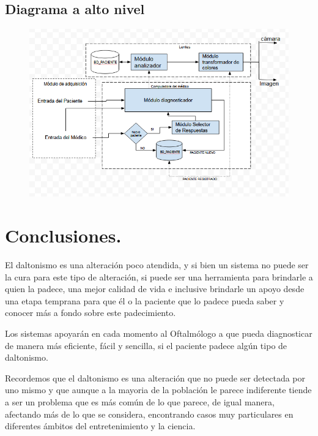 \documentclass[10pt]{article}
\begin{document}
\subsection{Diagrama a alto nivel}
\begin{figure}[H]
	\begin{center}
\includegraphics[scale = 0.75]{Imagenes/BOSQUEJO.PNG}
	\end{center} 
\end{figure}
\newpage
\section{Conclusiones.}

El daltonismo es una alteración poco atendida, y si bien un sistema no puede ser la cura para este tipo de alteración, si puede ser una herramienta para brindarle a quien la padece, una mejor calidad de vida e inclusive brindarle un apoyo desde una etapa temprana para que él o la paciente que lo padece pueda saber y conocer más a fondo sobre este padecimiento.

Los sistemas apoyarán en cada momento al Oftalmólogo a que pueda diagnosticar de manera más eficiente, fácil y sencilla, si el paciente padece algún tipo de daltonismo.

Recordemos que el daltonismo es una alteración que no puede ser detectada por uno mismo y que aunque a la mayoria de la población le parece indiferente tiende a ser un problema que es más común de lo que parece, de igual manera, afectando más de lo que se considera, encontrando casos muy particulares en diferentes ámbitos del entretenimiento y la ciencia.
\end{document}
